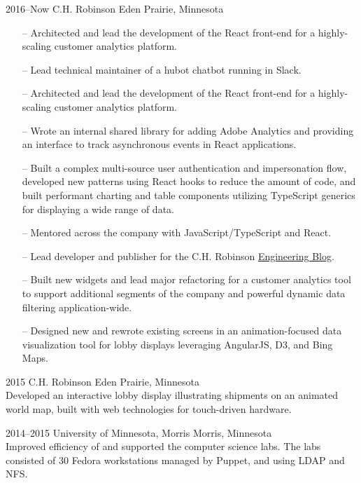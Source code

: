 \documentclass[]{cv-style} %
\begin{document}
\begin{entrylist}

\entry
{2016--Now}
{C.H. Robinson}
{Eden Prairie, Minnesota}
{
\begin{itemize}
    \item[--] Architected and lead the development of the React front-end for a highly-scaling customer analytics platform.
    \item[--] Lead technical maintainer of a hubot chatbot running in Slack.
\end{itemize}
\begin{itemize}
    \item[--] Architected and lead the development of the React front-end for a highly-scaling customer analytics platform.
    \item[--] Wrote an internal shared library for adding Adobe Analytics and providing an interface to track asynchronous events in React applications.
    \item[--] Built a complex multi-source user authentication and impersonation flow, developed new patterns using React hooks to reduce the amount of code, and built performant charting and table components utilizing TypeScript generics for displaying a wide range of data.
    \item[--] Mentored across the company with JavaScript/TypeScript and React.
    \item[--] Lead developer and publisher for the C.H. Robinson \href{https://engineering.chrobinson.com}{Engineering Blog}.
\end{itemize}
\begin{itemize}
    \item[--] Built new widgets and lead major refactoring for a customer analytics tool to support additional segments of the company and powerful dynamic data filtering application-wide.
    \item[--] Designed new and rewrote existing screens in an animation-focused data visualization tool for lobby displays leveraging AngularJS, D3, and Bing Maps.
\end{itemize}}


\entry
{2015}
{C.H. Robinson}
{Eden Prairie, Minnesota}
{ \\
Developed an interactive lobby display illustrating shipments on an animated world map, built with web technologies for touch-driven hardware.}


\entry
{2014--2015}
{University of Minnesota, Morris}
{Morris, Minnesota}
{ \\
Improved efficiency of and supported the computer science labs. The labs consisted of 30 Fedora workstations managed by Puppet, and using LDAP and NFS.}


\end{entrylist}
\end{document}
